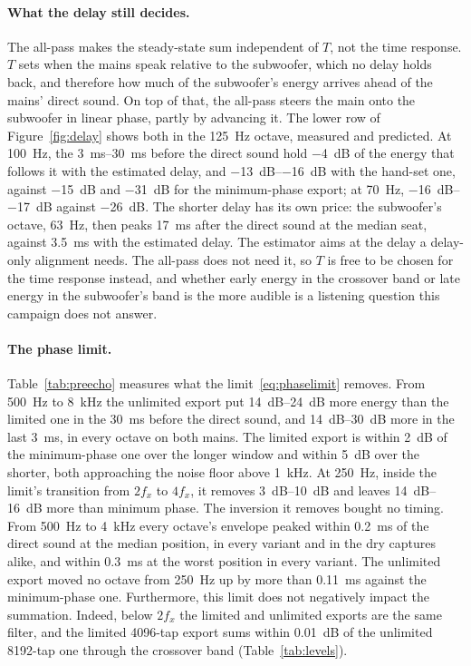 \documentclass[10pt,a4paper]{article}
\begin{document}
\paragraph{What the delay still decides.} The all-pass makes the steady-state sum independent of $T$, not the time response. $T$ sets when the mains speak relative to the subwoofer, which no delay holds back, and therefore how much of the subwoofer's energy arrives ahead of the mains' direct sound. On top of that, the all-pass steers the main onto the subwoofer in linear phase, partly by advancing it. The lower row of Figure~\ref{fig:delay} shows both in the \SI{125}{\hertz} octave, measured and predicted. At \SI{100}{\hertz}, the \SIrange{3}{30}{\milli\second} before the direct sound hold \SI{-4}{\dB} of the energy that follows it with the estimated delay, and \SIrange{-13}{-16}{\dB} with the hand-set one, against \SI{-15}{\dB} and \SI{-31}{\dB} for the minimum-phase export; at \SI{70}{\hertz}, \SIrange{-16}{-17}{\dB} against \SI{-26}{\dB}. The shorter delay has its own price: the subwoofer's octave, \SI{63}{\hertz}, then peaks \SI{17}{\milli\second} after the direct sound at the median seat, against \SI{3.5}{\milli\second} with the estimated delay. The estimator aims at the delay a delay-only alignment needs. The all-pass does not need it, so $T$ is free to be chosen for the time response instead, and whether early energy in the crossover band or late energy in the subwoofer's band is the more audible is a listening question this campaign does not answer.

\paragraph{The phase limit.} Table~\ref{tab:preecho} measures what the limit~\eqref{eq:phaselimit} removes. From \SI{500}{\hertz} to \SI{8}{\kilo\hertz} the unlimited export put \SIrange{14}{24}{\dB} more energy than the limited one in the \SI{30}{\milli\second} before the direct sound, and \SIrange{14}{30}{\dB} more in the last \SI{3}{\milli\second}, in every octave on both mains. The limited export is within \SI{2}{\dB} of the minimum-phase one over the longer window and within \SI{5}{\dB} over the shorter, both approaching the noise floor above \SI{1}{\kilo\hertz}. At \SI{250}{\hertz}, inside the limit's transition from $2f_x$ to $4f_x$, it removes \SIrange{3}{10}{\dB} and leaves \SIrange{14}{16}{\dB} more than minimum phase. The inversion it removes bought no timing. From \SI{500}{\hertz} to \SI{4}{\kilo\hertz} every octave's envelope peaked within \SI{0.2}{\milli\second} of the direct sound at the median position, in every variant and in the dry captures alike, and within \SI{0.3}{\milli\second} at the worst position in every variant. The unlimited export moved no octave from \SI{250}{\hertz} up by more than \SI{0.11}{\milli\second} against the minimum-phase one. Furthermore, this limit does not negatively impact the summation. Indeed, below $2f_x$ the limited and unlimited exports are the same filter, and the limited 4096-tap export sums within \SI{0.01}{\dB} of the unlimited 8192-tap one through the crossover band (Table~\ref{tab:levels}).
\end{document}
